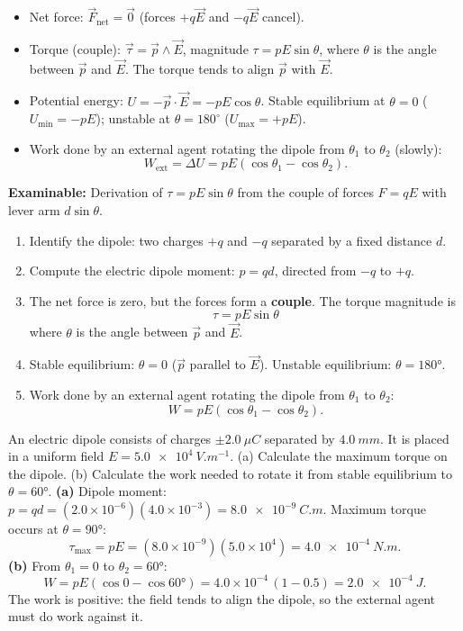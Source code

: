 \documentclass[11pt]{article}
\newcommand{\cle}[1]{{\popxbold\color{popdark}#1}}
\begin{document}
\begin{propriete}
\begin{itemize}
\item Net force: $\vec{F}_{\text{net}} = \vec{0}$ (forces $+q\vec{E}$ and $-q\vec{E}$ cancel).
\item Torque (couple): $\vec{\tau} = \vec{p} \wedge \vec{E}$, magnitude $\tau = pE\sin\theta$, where $\theta$ is the angle between $\vec{p}$ and $\vec{E}$. The torque tends to align $\vec{p}$ with $\vec{E}$.
\item Potential energy: $U = -\vec{p}\cdot\vec{E} = -pE\cos\theta$. Stable equilibrium at $\theta=0$ ($U_{\min}=-pE$); unstable at $\theta=180^\circ$ ($U_{\max}=+pE$).
\item Work done by an external agent rotating the dipole from $\theta_1$ to $\theta_2$ (slowly):
\[ W_{\text{ext}} = \Delta U = pE(\cos\theta_1 - \cos\theta_2). \]
\end{itemize}
\textbf{Examinable:} Derivation of $\tau = pE\sin\theta$ from the couple of forces $F = qE$ with lever arm $d\sin\theta$.
\end{propriete}

\begin{methode}
\begin{enumerate}
\item Identify the dipole: two charges $+q$ and $-q$ separated by a fixed distance $d$.
\item Compute the \cle{electric dipole moment}: $p = qd$, directed from $-q$ to $+q$.
\item The net force is zero, but the forces form a \textbf{couple}. The torque magnitude is
\[ \tau = pE\sin\theta \]
where $\theta$ is the angle between $\vec{p}$ and $\vec{E}$.
\item Stable equilibrium: $\theta = 0$ ($\vec{p}$ parallel to $\vec{E}$). Unstable equilibrium: $\theta = 180°$.
\item Work done by an external agent rotating the dipole from $\theta_1$ to $\theta_2$:
\[ W = pE(\cos\theta_1 - \cos\theta_2). \]
\end{enumerate}
\end{methode}

\begin{exoresolu}
An electric dipole consists of charges $\pm \SI{2.0}{\mu C}$ separated by $\SI{4.0}{mm}$. It is placed in a uniform field $E = \SI{5.0e4}{V.m^{-1}}$. (a) Calculate the maximum torque on the dipole. (b) Calculate the work needed to rotate it from stable equilibrium to $\theta = 60°$.
\tcblower
\textbf{(a)} Dipole moment: $p = qd = (2.0\times10^{-6})(4.0\times10^{-3}) = \SI{8.0e-9}{C.m}$.
Maximum torque occurs at $\theta = 90°$:
\[ \tau_{\max} = pE = (8.0\times10^{-9})(5.0\times10^{4}) = \SI{4.0e-4}{N.m}. \]
\textbf{(b)} From $\theta_1 = 0$ to $\theta_2 = 60°$:
\[ W = pE(\cos 0 - \cos 60°) = 4.0\times10^{-4}\,(1 - 0.5) = \SI{2.0e-4}{J}. \]
The work is positive: the field tends to align the dipole, so the external agent must do work against it.
\end{exoresolu}
\end{document}
